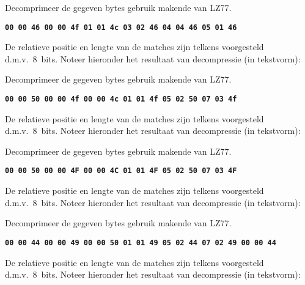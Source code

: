 \documentclass[]{pvm-exam}
\newcommand{\hex}[1]{\texttt{\bfseries #1}}
\begin{document}
\begin{question}
  Decomprimeer de gegeven bytes gebruik makende van LZ77.
  \begin{center}
    \hex{00 00 46 00 00 4f 01 01 4c 03 02 46 04 04 46 05 01 46}
  \end{center}
  De relatieve positie en lengte van de matches zijn telkens voorgesteld d.m.v.~8~bits.
  Noteer hieronder het resultaat van decompressie (in tekstvorm):
  \vskip5mm
  \begin{center}
  \end{center}
\end{question}

\begin{question}
  Decomprimeer de gegeven bytes gebruik makende van LZ77.
  \begin{center}
    \hex{00 00 50 00 00 4f 00 00 4c 01 01 4f 05 02 50 07 03 4f}
  \end{center}
  De relatieve positie en lengte van de matches zijn telkens voorgesteld d.m.v.~8~bits.
  Noteer hieronder het resultaat van decompressie (in tekstvorm):
  \vskip5mm
  \begin{center}
  \end{center}
\end{question}

\begin{question}
  Decomprimeer de gegeven bytes gebruik makende van LZ77.
  \begin{center}
    \hex{00 00 50 00 00 4F 00 00 4C 01 01 4F 05 02 50 07 03 4F}
  \end{center}
  De relatieve positie en lengte van de matches zijn telkens voorgesteld d.m.v.~8~bits.
  Noteer hieronder het resultaat van decompressie (in tekstvorm):
  \vskip5mm
  \begin{center}
  \end{center}
\end{question}

\begin{question}
  Decomprimeer de gegeven bytes gebruik makende van LZ77.
  \begin{center}
    \hex{00 00 44 00 00 49 00 00 50 01 01 49 05 02 44 07 02 49 00 00 44}
  \end{center}
  De relatieve positie en lengte van de matches zijn telkens voorgesteld d.m.v.~8~bits.
  Noteer hieronder het resultaat van decompressie (in tekstvorm):
  \vskip5mm
  \begin{center}
  \end{center}
\end{question}
\end{document}
